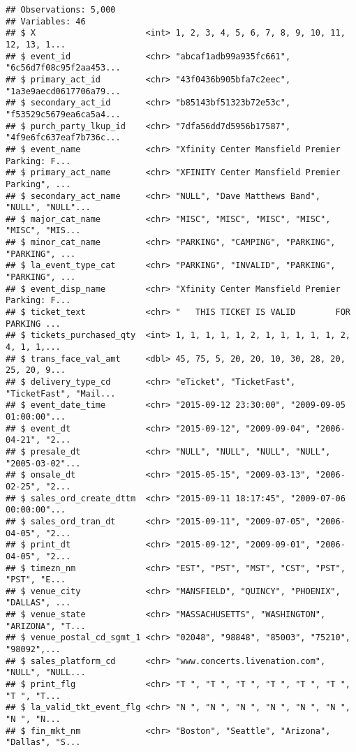 \documentclass[]{article}
\begin{document}
\begin{verbatim}
## Observations: 5,000
## Variables: 46
## $ X                      <int> 1, 2, 3, 4, 5, 6, 7, 8, 9, 10, 11, 12, 13, 1...
## $ event_id               <chr> "abcaf1adb99a935fc661", "6c56d7f08c95f2aa453...
## $ primary_act_id         <chr> "43f0436b905bfa7c2eec", "1a3e9aecd0617706a79...
## $ secondary_act_id       <chr> "b85143bf51323b72e53c", "f53529c5679ea6ca5a4...
## $ purch_party_lkup_id    <chr> "7dfa56dd7d5956b17587", "4f9e6fc637eaf7b736c...
## $ event_name             <chr> "Xfinity Center Mansfield Premier Parking: F...
## $ primary_act_name       <chr> "XFINITY Center Mansfield Premier Parking", ...
## $ secondary_act_name     <chr> "NULL", "Dave Matthews Band", "NULL", "NULL"...
## $ major_cat_name         <chr> "MISC", "MISC", "MISC", "MISC", "MISC", "MIS...
## $ minor_cat_name         <chr> "PARKING", "CAMPING", "PARKING", "PARKING", ...
## $ la_event_type_cat      <chr> "PARKING", "INVALID", "PARKING", "PARKING", ...
## $ event_disp_name        <chr> "Xfinity Center Mansfield Premier Parking: F...
## $ ticket_text            <chr> "   THIS TICKET IS VALID        FOR PARKING ...
## $ tickets_purchased_qty  <int> 1, 1, 1, 1, 1, 2, 1, 1, 1, 1, 1, 2, 4, 1, 1,...
## $ trans_face_val_amt     <dbl> 45, 75, 5, 20, 20, 10, 30, 28, 20, 25, 20, 9...
## $ delivery_type_cd       <chr> "eTicket", "TicketFast", "TicketFast", "Mail...
## $ event_date_time        <chr> "2015-09-12 23:30:00", "2009-09-05 01:00:00"...
## $ event_dt               <chr> "2015-09-12", "2009-09-04", "2006-04-21", "2...
## $ presale_dt             <chr> "NULL", "NULL", "NULL", "NULL", "2005-03-02"...
## $ onsale_dt              <chr> "2015-05-15", "2009-03-13", "2006-02-25", "2...
## $ sales_ord_create_dttm  <chr> "2015-09-11 18:17:45", "2009-07-06 00:00:00"...
## $ sales_ord_tran_dt      <chr> "2015-09-11", "2009-07-05", "2006-04-05", "2...
## $ print_dt               <chr> "2015-09-12", "2009-09-01", "2006-04-05", "2...
## $ timezn_nm              <chr> "EST", "PST", "MST", "CST", "PST", "PST", "E...
## $ venue_city             <chr> "MANSFIELD", "QUINCY", "PHOENIX", "DALLAS", ...
## $ venue_state            <chr> "MASSACHUSETTS", "WASHINGTON", "ARIZONA", "T...
## $ venue_postal_cd_sgmt_1 <chr> "02048", "98848", "85003", "75210", "98092",...
## $ sales_platform_cd      <chr> "www.concerts.livenation.com", "NULL", "NULL...
## $ print_flg              <chr> "T ", "T ", "T ", "T ", "T ", "T ", "T ", "T...
## $ la_valid_tkt_event_flg <chr> "N ", "N ", "N ", "N ", "N ", "N ", "N ", "N...
## $ fin_mkt_nm             <chr> "Boston", "Seattle", "Arizona", "Dallas", "S...

\end{verbatim}
\end{document}
